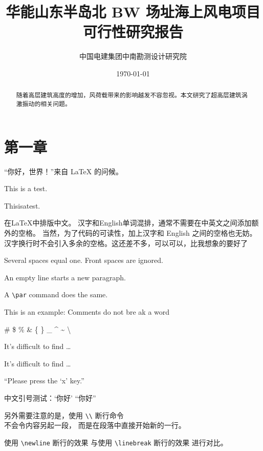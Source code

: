 \documentclass[11pt,a4paper]{report}
\title{ \textbf{华能山东半岛北 BW 场址海上风电项目} \\	可行性研究报告}
\author{ 中国电建集团中南勘测设计研究院}
\date{\today}
\begin{document}
	
\maketitle

\begin{abstract}
	随着高层建筑高度的增加，风荷载带来的影响越发不容忽视。本文研究了超高层建筑涡激振动的相关问题。
\end{abstract}

\section{第一章}
“你好，世界！”来自 \LaTeX{} 的问候。

This   is   a   test.

This\hspace{3em}is\hspace{3em}a\hspace{3em}test.	

在\LaTeX{}中排版中文。
汉字和English单词混排，通常不需要在中英文之间添加额外的空格。
当然，为了代码的可读性，加上汉字和 English 之间的空格也无妨。 
汉字换行时不会引入多余的空格。这还差不多，可以可以，比我想象的要好了

Several spaces equal one.
Front spaces are ignored.

An empty line starts a new
paragraph.\par
A \verb|\par| command does
the same.

This is an %
example: Comments do not bre%
ak a word

\# \$ \% \& \{ \} \_
\^{} \~{} \textbackslash

It's difficult to find \ldots

It's dif{}f{}icult to f{}ind \ldots

``Please press the `x' key.'' 

中文引号测试：‘你好’ “你好”

\newpage

另外需要注意的是，使用 \verb|\\|
断行命令 \\ 不会令内容另起一段，
而是在段落中直接开始新的一行。

使用 \verb|\newline| 断行的效果
\newline
与使用 \verb|\linebreak| 断行的效果
\linebreak
进行对比。
\end{document}
